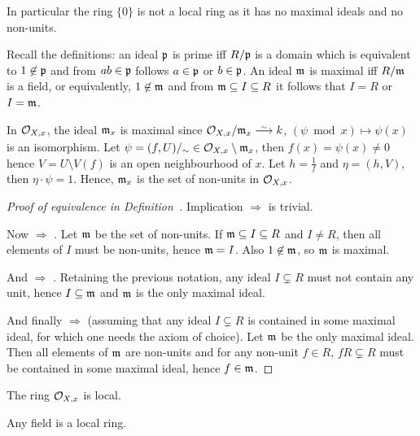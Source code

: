 \documentclass[a4paper,parskip=half,numbers=enddot, DIV=12]{scrreprt}
\begin{document}
	\begin{rem}
	\begin{alphanumerate}
	\item 
		In particular the ring $\{0\}$ is not a local ring as it has no maximal ideals and no non-units.
	\item 
		Recall the definitions: an ideal $\mathfrak{p}$ is prime iff $R/\mathfrak{p}$ is a domain which is equivalent to $1\not\in \mathfrak{p}$ and from $ab\in \mathfrak{p}$ follows $a\in \mathfrak{p}$ or $b\in \mathfrak{p}$. An ideal $\mathfrak{m}$ is maximal iff $R/\mathfrak{m}$ is a field, or equivalently, $1\not\in \mathfrak{m}$ and from $\mathfrak{m}\subseteq I\subseteq R$ it follows that $I=R$ or $I=\mathfrak{m}$.
	\item
		 In $\mathcal{O}_{X,x}$, the ideal $\mathfrak{m}_x$ is maximal since $\Oo_{X,x}/\mm_x \isomorphism k$, $(\psi\bmod x)\mapsto \psi(x)$ is an isomorphism. Let $\psi = (f,U)/_\sim\in \mathcal{O}_{X,x}\setminus \mathfrak{m}_x$, then $f(x) = \psi(x) \neq 0$ hence $V=U\setminus V(f)$ is an open neighbourhood of $x$. Let $h=\frac{1}{f}$ and $\eta = (h, V)$, then $\eta\cdot \psi = 1$. Hence, $\mathfrak{m}_x$ is the set of non-units in $\mathcal{O}_{X,x}$.
	\end{alphanumerate}
	\begin{proof}[Proof of equivalence in Definition~]
		Implication  $\Rightarrow$  is trivial.
	
		Now  $\Rightarrow$ . Let $\mathfrak{m}$ be the set of non-units. If $\mathfrak{m}\subseteq I\subseteq R$ and $I\neq R$, then all elements of $I$ must be non-units, hence $\mathfrak{m} = I$. Also $1\not\in \mathfrak{m}$, so $\mathfrak{m}$ is maximal.
		
		And  $\Rightarrow$ . Retaining the previous notation, any ideal $I\subsetneq R$ must not contain any unit, hence $I\subseteq \mathfrak{m}$ and $\mathfrak{m}$ is the only maximal ideal.
		
		And finally  $\Rightarrow$  (assuming that any ideal $I\subsetneq R$ is contained in some maximal ideal, for which one needs the axiom of choice). Let $\mathfrak{m}$ be the only maximal ideal. Then all elements of $\mathfrak{m}$ are non-units and for any non-unit $f\in R$, $fR\subsetneq R$ must be contained in some maximal ideal, hence $f\in\mathfrak{m}$.
	\end{proof}
	\end{rem}
	\begin{example}
		\begin{alphanumerate}
		\item 
			The ring $\mathcal{O}_{X,x}$ is local.
		\item 
			Any field is a local ring.
		\end{alphanumerate}

	\end{example}
\end{document}
